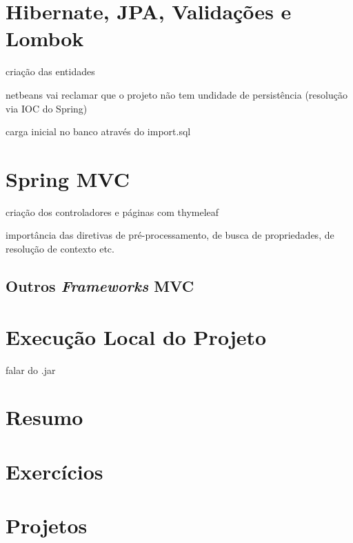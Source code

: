 \section{Hibernate, JPA, Validações e Lombok}

criação das entidades

netbeans vai reclamar que o projeto não tem undidade de persistência (resolução via IOC do Spring)

carga inicial no banco através do import.sql


\section{Spring MVC}

criação dos controladores e páginas com thymeleaf

importância das diretivas de pré-processamento, de busca de propriedades, de resolução de contexto etc.

\subsection{Outros \textit{Frameworks} MVC}


\section{Execução Local do Projeto}

falar do .jar


\section{Resumo}

\section{Exercícios}

\section{Projetos}
